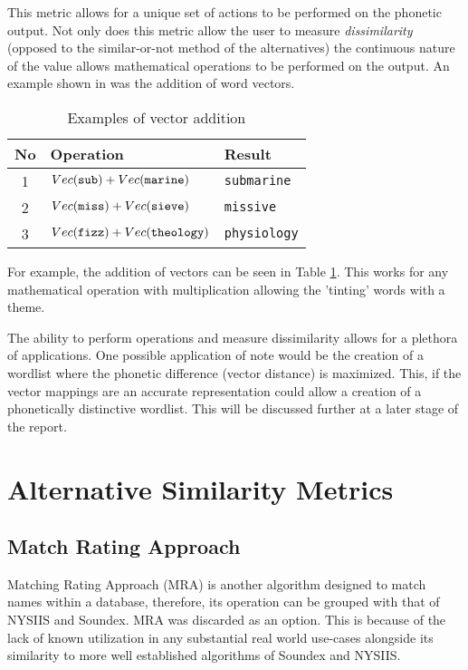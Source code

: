 This metric allows for a unique set of actions to be performed on the phonetic output. Not only does this metric allow the user to measure \textit{dissimilarity} (opposed to the similar-or-not method of the alternatives) the continuous nature of the value allows mathematical operations to be performed on the output. An example shown in \cite{parrish2017poetic} was the addition of word vectors.

\begin{table}[!htb]
    \centering
    \begin{tabular}{cll}
        No & Operation & Result \\
        \hline
        1  & $Vec(\verb|sub|) + Vec(\verb|marine|)$ & \verb|submarine| \\
        2  & $Vec(\verb|miss|) + Vec(\verb|sieve|)$ & \verb|missive| \\
        3  & $Vec(\verb|fizz|) + Vec(\verb|theology|)$ & \verb|physiology| \\
    \end{tabular}
    \caption{Examples of vector addition}
    \label{tab:vectorAdd}
\end{table}

For example, the addition of vectors can be seen in Table \ref{tab:vectorAdd}. This works for any mathematical operation with multiplication allowing the 'tinting' words with a theme.

The ability to perform operations and measure dissimilarity allows for a plethora of applications. One possible application of note would be the creation of a wordlist where the phonetic difference (vector distance) is maximized. This, if the vector mappings are an accurate representation could allow a creation of a phonetically distinctive wordlist. This will be discussed further at a later stage of the report.

\section{Alternative Similarity Metrics}

\subsection{Match Rating Approach}
Matching Rating Approach (MRA) is another algorithm designed to match names within a database, therefore, its operation can be grouped with that of NYSIIS and Soundex. MRA was discarded as an option. This is because of the lack of known utilization in any substantial real world use-cases alongside its similarity to more well established algorithms of Soundex and NYSIIS.

